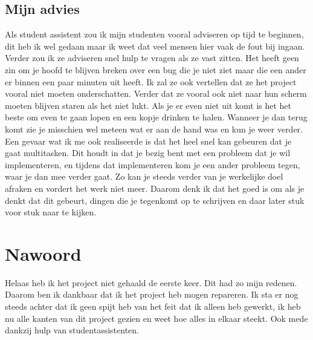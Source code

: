 \documentclass[12pt]{article}
\begin{document}
\subsection{Mijn advies}
Als student assistent zou ik mijn studenten vooral adviseren op tijd te beginnen, dit heb ik wel gedaan maar ik weet dat veel mensen hier vaak de fout bij ingaan. Verder zou ik ze adviseren snel hulp te vragen als ze vast zitten. Het heeft geen zin om je hoofd te blijven breken over een bug die je niet ziet maar die een ander er binnen een paar minuten uit heeft. Ik zal ze ook vertellen dat ze het project vooral niet moeten onderschatten. Verder dat ze vooral ook niet naar hun scherm moeten blijven staren als het niet lukt. Als je er even niet uit komt is het het beste om even te gaan lopen en een kopje drinken te halen. Wanneer je dan terug komt zie je misschien wel meteen wat er aan de hand was en kun je weer verder.\\
Een gevaar wat ik me ook realiseerde is dat het heel snel kan gebeuren dat je gaat multitasken. Dit houdt in dat je bezig bent met een probleem dat je wil implementeren, en tijdens dat implementeren kom je een ander probleem tegen, waar je dan mee verder gaat. Zo kan je steeds verder van je werkelijke doel afraken en vordert het werk niet meer. Daarom denk ik dat het goed is om als je denkt dat dit gebeurt, dingen die je tegenkomt op te schrijven en daar later stuk voor stuk naar te kijken.
\section{Nawoord}
Helaas heb ik het project niet gehaald de eerste keer. Dit had zo mijn redenen. Daarom ben ik dankbaar dat ik het project heb mogen repareren. Ik sta er nog steeds achter dat ik geen spijt heb van het feit dat ik alleen heb gewerkt, ik heb nu alle kanten van dit project gezien en weet hoe alles in elkaar steekt. Ook mede dankzij hulp van studentassistenten. 
\end{document}
